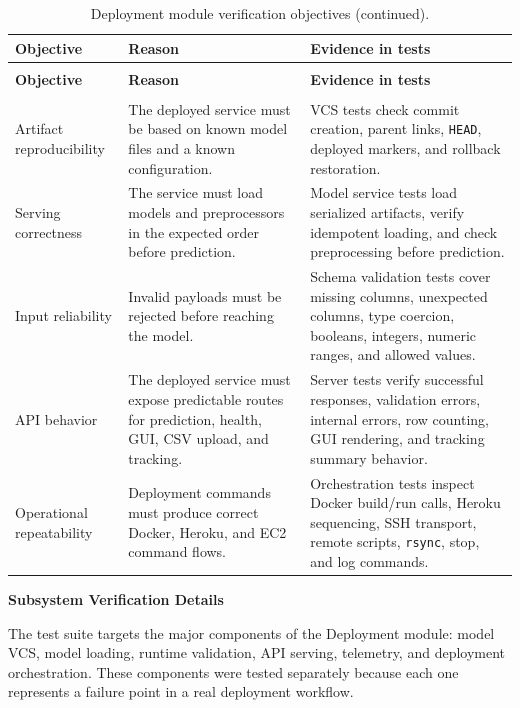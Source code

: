 \acceleraTableStyle
\begin{longtable}{>{\raggedright\arraybackslash}p{}
  >{\raggedright\arraybackslash}p{}
  >{\raggedright\arraybackslash}p{}}
\caption{Deployment module verification objectives.}
\label{tab:deployment_verification_objectives}\\
\toprule
\textbf{Objective} & \textbf{Reason} & \textbf{Evidence in tests} \\
\midrule
\endfirsthead
\caption[]{Deployment module verification objectives (continued).}\\
\toprule
\textbf{Objective} & \textbf{Reason} & \textbf{Evidence in tests} \\
\midrule
\endhead
\midrule
\multicolumn{3}{r}{\small Continued on the next page}\\
\endfoot
\bottomrule
\endlastfoot
Artifact reproducibility &
The deployed service must be based on known model files and a known
configuration. &
VCS tests check commit creation, parent links, \texttt{HEAD}, deployed markers,
and rollback restoration. \\
\midrule
Serving correctness &
The service must load models and preprocessors in the expected order before
prediction. &
Model service tests load serialized artifacts, verify idempotent loading, and
check preprocessing before prediction. \\
\midrule
Input reliability &
Invalid payloads must be rejected before reaching the model. &
Schema validation tests cover missing columns, unexpected columns, type
coercion, booleans, integers, numeric ranges, and allowed values. \\
\midrule
API behavior &
The deployed service must expose predictable routes for prediction, health,
GUI, CSV upload, and tracking. &
Server tests verify successful responses, validation errors, internal errors,
row counting, GUI rendering, and tracking summary behavior. \\
\midrule
Operational repeatability &
Deployment commands must produce correct Docker, Heroku, and EC2 command
flows. &
Orchestration tests inspect Docker build/run calls, Heroku sequencing, SSH
transport, remote scripts, \texttt{rsync}, stop, and log commands. \\
\end{longtable}

\medskip
\noindent\textbf{Subsystem Verification Details}\par\smallskip
\noindent The test suite targets the major components of the Deployment module:
model VCS, model loading, runtime validation, API serving, telemetry, and
deployment orchestration. These components were tested separately because each
one represents a failure point in a real deployment workflow.


